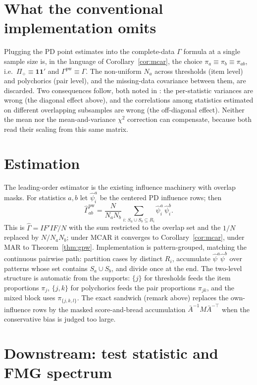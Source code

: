 \documentclass[11pt]{article}
\newcommand{\one}{\mathbf{1}}
\newcommand{\pw}{\mathrm{pw}}
\newcommand{\Ghat}{\widehat{\Gamma}}
\theoremstyle{plain}
\theoremstyle{remark}
\begin{document}
\section*{What the conventional implementation omits}

Plugging the PD point estimates into the complete-data $\Gamma$ formula at a
single sample size is, in the language of Corollary~\ref{cor:mcar}, the choice
$\pi_a\equiv\pi_b\equiv\pi_{ab}$, i.e.\ $\Pi_{\!\div}\equiv\one\one'$ and
$\Gamma^{\pw}\equiv\Gamma$. The non-uniform $N_a$ across thresholds (item level)
and polychorics (pair level), and the missing-data covariance between them, are
discarded. Two consequences follow, both noted in \cite{chen2020}: the
per-statistic variances are wrong (the diagonal effect above), and the
correlations among statistics estimated on different overlapping subsamples are
wrong (the off-diagonal effect). Neither the mean nor the mean-and-variance
$\chi^2$ correction can compensate, because both read their scaling from this
same matrix.

\section*{Estimation}

The leading-order estimator is the existing influence machinery with overlap
masks. For statistics $a,b$ let $\widehat\psi^a_i$ be the centered PD influence
rows; then
\[
  \Ghat^{\pw}_{ab}
  = \frac{N}{N_a N_b}\sum_{i:\,S_a\cup S_b\subseteq R_i}
      \widehat\psi^a_i\,\widehat\psi^b_i .
\]
This is $\Ghat=IF'IF/N$ with the sum restricted to the overlap set and the
$1/N$ replaced by $N/N_aN_b$; under MCAR it converges to
Corollary~\ref{cor:mcar}, under MAR to Theorem~\ref{thm:gpw}. Implementation is
pattern-grouped, matching the continuous pairwise path: partition cases by
distinct $R_i$, accumulate $\widehat\psi^a\widehat\psi^b$ over patterns whose set
contains $S_a\cup S_b$, and divide once at the end. The two-level structure is
automatic from the supports: $\{j\}$ for thresholds feeds the item proportions
$\pi_j$, $\{j,k\}$ for polychorics feeds the pair proportions $\pi_{jk}$, and the
mixed block uses $\pi_{\{j,k,l\}}$. The exact sandwich (remark above) replaces the
own-influence rows by the masked score-and-bread accumulation
$\bar A^{-1}M\bar A^{-\top}$ when the conservative bias is judged too large.

\section*{Downstream: test statistic and FMG spectrum}
\end{document}

